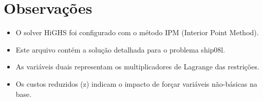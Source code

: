 \documentclass[12pt]{article}
\begin{document}
\section{Observações}

\begin{itemize}
\item O solver HiGHS foi configurado com o método IPM (Interior Point Method).
\item Este arquivo contém a solução detalhada para o problema ship08l.
\item As variáveis duais representam os multiplicadores de Lagrange das restrições.
\item Os custos reduzidos (z) indicam o impacto de forçar variáveis não-básicas na base.
\end{itemize}
\end{document}
